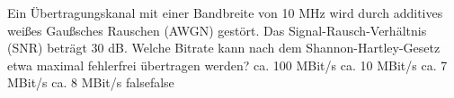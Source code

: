     {Ein Übertragungskanal mit einer Bandbreite von 10 MHz wird durch additives weißes Gaußsches Rauschen (AWGN) gestört. Das Signal-Rausch-Verhältnis (SNR) beträgt 30 dB. Welche Bitrate kann nach dem Shannon-Hartley-Gesetz etwa maximal fehlerfrei übertragen werden?}
    {ca. 100 MBit/s}
    {ca. 10 MBit/s}
    {ca. 7 MBit/s}
    {ca. 8 MBit/s}
    {false}{false}